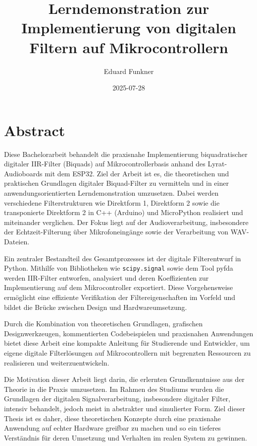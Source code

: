 \documentclass[
  ngerman,
  letterpaper,
  DIV=11]{scrreprt}
\title{Lerndemonstration zur Implementierung von digitalen Filtern auf
Mikrocontrollern}
\author{Eduard Funkner}
\date{2025-07-28}
\renewcommand*\contentsname{Inhaltsverzeichnis}
\newcommand\contentsname{Inhaltsverzeichnis}
\begin{document}
\maketitle

\renewcommand*\contentsname{Inhaltsverzeichnis}
{
\hypersetup{linkcolor=}
\setcounter{tocdepth}{2}
\tableofcontents
}

\chapter{Abstract}\label{abstract}

Diese Bachelorarbeit behandelt die praxisnahe Implementierung
biquadratischer digitaler IIR-Filter (Biquads) auf Mikrocontrollerbasis
anhand des Lyrat-Audioboards mit dem ESP32. Ziel der Arbeit ist es, die
theoretischen und praktischen Grundlagen digitaler Biquad-Filter zu
vermitteln und in einer anwendungsorientierten Lerndemonstration
umzusetzen. Dabei werden verschiedene Filterstrukturen wie Direktform 1,
Direktform 2 sowie die transponierte Direktform 2 in C++ (Arduino) und
MicroPython realisiert und miteinander verglichen. Der Fokus liegt auf
der Audioverarbeitung, insbesondere der Echtzeit-Filterung über
Mikrofoneingänge sowie der Verarbeitung von WAV-Dateien.

Ein zentraler Bestandteil des Gesamtprozesses ist der digitale
Filterentwurf in Python. Mithilfe von Bibliotheken wie
\texttt{scipy.signal} sowie dem Tool pyfda werden IIR-Filter entworfen,
analysiert und deren Koeffizienten zur Implementierung auf dem
Mikrocontroller exportiert. Diese Vorgehensweise ermöglicht eine
effiziente Verifikation der Filtereigenschaften im Vorfeld und bildet
die Brücke zwischen Design und Hardwareumsetzung.

Durch die Kombination von theoretischen Grundlagen, grafischen
Designwerkzeugen, kommentierten Codebeispielen und praxisnahen
Anwendungen bietet diese Arbeit eine kompakte Anleitung für Studierende
und Entwickler, um eigene digitale Filterlösungen auf Mikrocontrollern
mit begrenzten Ressourcen zu realisieren und weiterzuentwickeln.

Die Motivation dieser Arbeit liegt darin, die erlernten Grundkenntnisse
aus der Theorie in die Praxis umzusetzen. Im Rahmen des Studiums wurden
die Grundlagen der digitalen Signalverarbeitung, insbesondere digitaler
Filter, intensiv behandelt, jedoch meist in abstrakter und simulierter
Form. Ziel dieser Thesis ist es daher, diese theoretischen Konzepte
durch eine praxisnahe Anwendung auf echter Hardware greifbar zu machen
und so ein tieferes Verständnis für deren Umsetzung und Verhalten im
realen System zu gewinnen.
\end{document}
